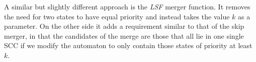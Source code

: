 A similar but slightly different approach is the \emph{LSF} merger function. It removes the need for two states to have equal priority and instead takes the value $k$ as a parameter. On the other side it adds a requirement similar to that of the skip merger, in that the candidates of the merge are those that all lie in one single SCC if we modify the automaton to only contain those states of priority at least $k$.
\vspace{5pt}







